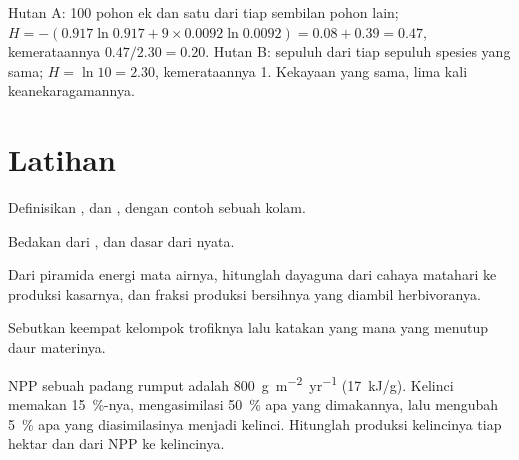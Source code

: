 \begin{example}\label{ex:b1:ecosystem-organization:twowoods}
Hutan A: 100 pohon ek dan satu dari tiap sembilan pohon lain; $H = -(0.917\ln
0.917 + 9\times 0.0092\ln 0.0092) = 0.08 + 0.39 = 0.47$, kemerataannya
$0.47/2.30 = 0.20$. Hutan B: sepuluh dari tiap sepuluh spesies yang sama; $H =
\ln 10 = 2.30$, kemerataannya 1. Kekayaan yang sama, lima kali keanekaragamannya.
\end{example}

\section{Latihan}

\begin{exercise}[$\star$]\label{exo:b1:ecosystem-organization:1}
Definisikan ,  dan , dengan contoh sebuah kolam.
\end{exercise}

\begin{exercise}[$\star$]\label{exo:b1:ecosystem-organization:2}
Bedakan  dari , dan  dasar dari  nyata.
\end{exercise}

\begin{exercise}[$\star$]\label{exo:b1:ecosystem-organization:3}
Dari piramida energi mata airnya, hitunglah dayaguna dari cahaya
matahari ke produksi kasarnya, dan fraksi produksi bersihnya yang
diambil herbivoranya.
\end{exercise}

\begin{exercise}[$\star$]\label{exo:b1:ecosystem-organization:4}
Sebutkan keempat kelompok trofiknya lalu katakan yang mana yang
menutup daur materinya.
\end{exercise}

\begin{exercise}[$\star\star$]\label{exo:b1:ecosystem-organization:5}
NPP sebuah padang rumput adalah \qty{800}{g.m^{-2}.yr^{-1}}
(\qty{17}{kJ/g}). Kelinci memakan \qty{15}{\%}-nya, mengasimilasi
\qty{50}{\%} apa yang dimakannya, lalu mengubah \qty{5}{\%} apa yang
diasimilasinya menjadi kelinci. Hitunglah produksi kelincinya tiap
hektar dan  dari NPP ke kelincinya.
\end{exercise}

